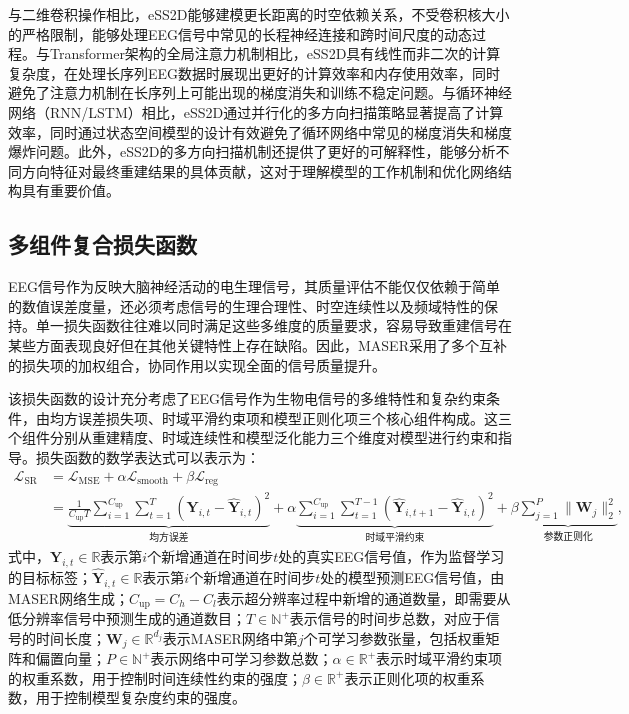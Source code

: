 与二维卷积操作相比，eSS2D能够建模更长距离的时空依赖关系，不受卷积核大小的严格限制，能够处理EEG信号中常见的长程神经连接和跨时间尺度的动态过程。与Transformer架构的全局注意力机制相比，eSS2D具有线性而非二次的计算复杂度，在处理长序列EEG数据时展现出更好的计算效率和内存使用效率，同时避免了注意力机制在长序列上可能出现的梯度消失和训练不稳定问题。与循环神经网络（RNN/LSTM）相比，eSS2D通过并行化的多方向扫描策略显著提高了计算效率，同时通过状态空间模型的设计有效避免了循环网络中常见的梯度消失和梯度爆炸问题。此外，eSS2D的多方向扫描机制还提供了更好的可解释性，能够分析不同方向特征对最终重建结果的具体贡献，这对于理解模型的工作机制和优化网络结构具有重要价值。

\subsection{多组件复合损失函数}
EEG信号作为反映大脑神经活动的电生理信号，其质量评估不能仅仅依赖于简单的数值误差度量，还必须考虑信号的生理合理性、时空连续性以及频域特性的保持。单一损失函数往往难以同时满足这些多维度的质量要求，容易导致重建信号在某些方面表现良好但在其他关键特性上存在缺陷。因此，MASER采用了多个互补的损失项的加权组合，协同作用以实现全面的信号质量提升。


该损失函数的设计充分考虑了EEG信号作为生物电信号的多维特性和复杂约束条件，由均方误差损失项、时域平滑约束项和模型正则化项三个核心组件构成。这三个组件分别从重建精度、时域连续性和模型泛化能力三个维度对模型进行约束和指导。损失函数的数学表达式可以表示为：
\begin{equation}
\begin{aligned}
\mathcal{L}_{\text{SR}} &= \mathcal{L}_{\text{MSE}} + \alpha \mathcal{L}_{\text{smooth}} + \beta \mathcal{L}_{\text{reg}} \\
&= \underbrace{\frac{1}{C_{\text{up}} T} \sum_{i=1}^{C_{\text{up}}} \sum_{t=1}^{T} \left(\mathbf{Y}_{i,t} - \hat{\mathbf{Y}}_{i,t}\right)^2}_{\text{均方误差}} 
 + \alpha \underbrace{\sum_{i=1}^{C_{\text{up}}} \sum_{t=1}^{T-1} \left(\hat{\mathbf{Y}}_{i,t+1} - \hat{\mathbf{Y}}_{i,t}\right)^2}_{\text{时域平滑约束}}  + \beta \underbrace{\sum_{j=1}^{P} \|\mathbf{W}_j\|_2^2}_{\text{参数正则化}},
\end{aligned}
\end{equation}
式中，$\mathbf{Y}_{i,t} \in \mathbb{R}$表示第$i$个新增通道在时间步$t$处的真实EEG信号值，作为监督学习的目标标签；$\hat{\mathbf{Y}}_{i,t} \in \mathbb{R}$表示第$i$个新增通道在时间步$t$处的模型预测EEG信号值，由MASER网络生成；$C_{\text{up}} = C_h - C_l$表示超分辨率过程中新增的通道数量，即需要从低分辨率信号中预测生成的通道数目；$T \in \mathbb{N}^+$表示信号的时间步总数，对应于信号的时间长度；$\mathbf{W}_j \in \mathbb{R}^{d_j}$表示MASER网络中第$j$个可学习参数张量，包括权重矩阵和偏置向量；$P \in \mathbb{N}^+$表示网络中可学习参数总数；$\alpha \in \mathbb{R}^+$表示时域平滑约束项的权重系数，用于控制时间连续性约束的强度；$\beta \in \mathbb{R}^+$表示正则化项的权重系数，用于控制模型复杂度约束的强度。

